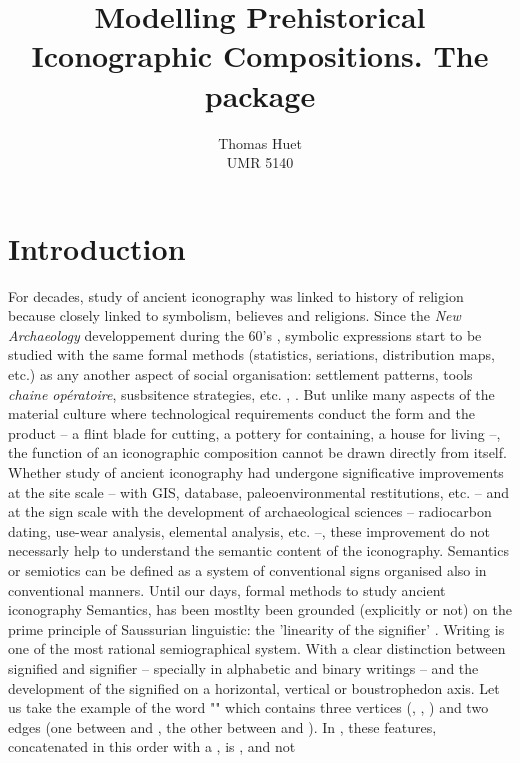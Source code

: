 \documentclass[article]{jss}\usepackage{knitr}
\author{Thomas Huet\\UMR 5140}
\title{Modelling Prehistorical Iconographic Compositions. The \proglang{R} package \pkg{decorr}}
\begin{document}

\section[Introduction]{Introduction} \label{sec:intro}

For decades, study of ancient iconography was linked to history of religion because closely linked to symbolism, believes and religions. Since the \textit{New Archaeology} developpement during the 60's \citep{Clarke14}, symbolic expressions start to be studied with the same formal methods (statistics, seriations, distribution maps, etc.) as any another aspect of social organisation: settlement patterns, tools \emph{chaine op\'eratoire}, susbsitence strategies, etc. \citep{Renfrew91}, \citep{LeroiGourhan92}. But unlike many aspects of the material culture where technological requirements conduct the form and the product -- a flint blade for cutting, a pottery for containing, a house for living --, the function of an iconographic composition cannot be drawn directly from itself.  Whether study of ancient iconography had  undergone significative improvements at the site scale -- with GIS, database, paleoenvironmental restitutions, etc. -- and at the sign scale with the development of archaeological sciences -- radiocarbon dating, use-wear analysis, elemental analysis, etc. --, these improvement do not necessarly help to understand the semantic content of the iconography.
Semantics or semiotics can be defined as a system of conventional signs organised also in conventional manners. 
Until our days, formal methods to study ancient iconography Semantics, has been mostlty been grounded (explicitly or not) on the prime principle of Saussurian linguistic: the 'linearity of the signifier' \citep{Saussure89}.  
Writing is one of the most rational semiographical system. With a clear distinction between signified and signifier -- specially in alphabetic and binary writings -- and the development of the signified on a horizontal, vertical or boustrophedon axis. 
Let us take the example of the word "" which contains three vertices (, , ) and two edges (one between  and , the other between  and ). In , these features, concatenated in this order with a , is , and not 
\end{document}
